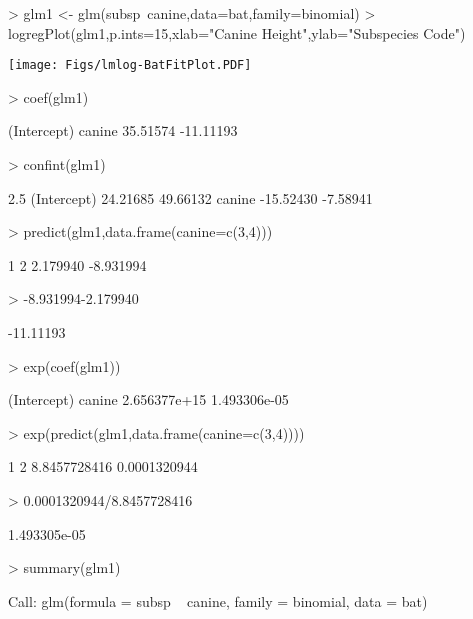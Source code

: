 \documentclass[a4paper]{article}
\begin{document}
\begin{Schunk}
\begin{Sinput}
> glm1 <- glm(subsp~canine,data=bat,family=binomial)
> logregPlot(glm1,p.ints=15,xlab="Canine Height",ylab="Subspecies Code")
\end{Sinput}
\end{Schunk}
\texttt{[image: Figs/lmlog-BatFitPlot.PDF]}

\begin{Schunk}
\begin{Sinput}
> coef(glm1)
\end{Sinput}
\begin{Soutput}
(Intercept)      canine 
   35.51574   -11.11193 
\end{Soutput}
\begin{Sinput}
> confint(glm1)
\end{Sinput}
\begin{Soutput}
                2.5 %   97.5 %
(Intercept)  24.21685 49.66132
canine      -15.52430 -7.58941
\end{Soutput}
\begin{Sinput}
> predict(glm1,data.frame(canine=c(3,4)))
\end{Sinput}
\begin{Soutput}
        1         2 
 2.179940 -8.931994 
\end{Soutput}
\begin{Sinput}
> -8.931994-2.179940
\end{Sinput}
\begin{Soutput}
[1] -11.11193
\end{Soutput}
\begin{Sinput}
> exp(coef(glm1))
\end{Sinput}
\begin{Soutput}
 (Intercept)       canine 
2.656377e+15 1.493306e-05 
\end{Soutput}
\begin{Sinput}
> exp(predict(glm1,data.frame(canine=c(3,4))))
\end{Sinput}
\begin{Soutput}
           1            2 
8.8457728416 0.0001320944 
\end{Soutput}
\begin{Sinput}
> 0.0001320944/8.8457728416
\end{Sinput}
\begin{Soutput}
[1] 1.493305e-05
\end{Soutput}
\begin{Sinput}
> summary(glm1)
\end{Sinput}
\begin{Soutput}
Call:
glm(formula = subsp ~ canine, family = binomial, data = bat)


\end{Soutput}
\end{Schunk}
\end{document}
